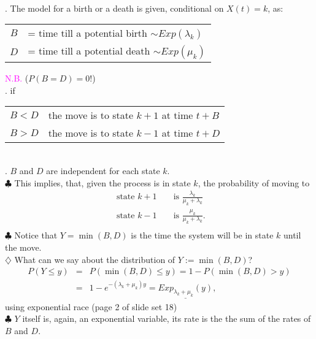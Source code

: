 \documentclass[20pt,landscape]{foils}
\newcommand{\no}{\noindent}
\begin{document}
{{%
\foilhead[-.8in]{\textcolor{blue}{Modeling B \& D Processes}}
\no  {\textcolor{magenta}{Model:}} \\[.1in]
\no 1. The model for a birth or a death is given, conditional on $X(t) = k$, as:
\begin{tabular}{cl}
    $B$ & = time till a potential birth $\sim Exp(\lambda_{k})$ \\
    $D$ & = time till a potential death $\sim Exp(\mu_{k})$ \\
\end{tabular}   {\textcolor{magenta}{N.B.}} ($P(B=D) = 0$!)\\[.1in]
\no 2. if  
\begin{tabular}{cl}
$B < D$ & the move is to state $k+1$ at time $t+B$ \\
$B > D$ & the move is to state $k-1$ at time $t+D$ \\
\end{tabular}\\[.1in]
\no 3. $B$ and $D$ are independent for each state $k$.\\[.1in]
\no $\clubsuit$ This implies, that, given the process is in state $k$, the
probability of moving to\\[-.4in]
\begin{eqnarray*}
   \text{ state } k+1 && \text{ is  } \frac{\lambda_{k}}{\mu_{k} + \lambda_{k}} \\
   \text{ state } k-1 && \text{ is  } \frac{\mu_{k}}{\mu_{k} + \lambda_{k}}. \\
\end{eqnarray*}
\foilhead[-.8in]{\textcolor{blue}{Modeling (Cont'd)}}\vspace*{2mm}
\no $\clubsuit$ Notice that $Y = \min (B,D)$ is the time the system will be in state $k$ until the move. \\[.1in]
 \no $\diamondsuit$ What can we say about the distribution of $Y := \min (B,D)$?\\[-.5in]
\begin{eqnarray*}
    P(Y \le y) &=& P( \min (B,D) \le y) = 1-P(\min(B,D)>y)\\
    &=& 1 - e^{-(\lambda_{k} + \mu_{k})y} =
    \underline{Exp_{\lambda_{k}+ \mu_{k}}(y)},
\end{eqnarray*}
using exponential race (page 2 of slide set 18)\\[.1in]
\no $\clubsuit$ $Y$ itself is, again, an exponential variable, its rate is the the
sum of the rates of $B$ and $D$.

}}
\end{document}
